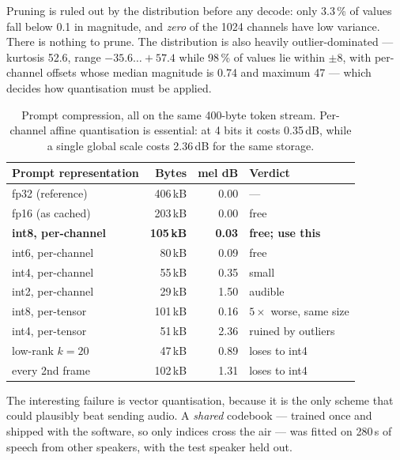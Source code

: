 Pruning is ruled out by the distribution before any decode: only
3.3\,\% of values fall below 0.1 in magnitude, and \emph{zero} of the
1024 channels have low variance.  There is nothing to prune.  The
distribution is also heavily outlier-dominated --- kurtosis 52.6, range
$-35.6\ldots+57.4$ while 98\,\% of values lie within $\pm 8$, with
per-channel offsets whose median magnitude is 0.74 and maximum 47 ---
which decides how quantisation must be applied.

\begin{table}[H]
    \centering
    \caption{Prompt compression, all on the same 400-byte token stream.
             Per-channel affine quantisation is essential: at 4 bits it
             costs 0.35\,dB, while a single global scale costs 2.36\,dB
             for the same storage.}
    \label{tab:voice_quant}
    \small
    \begin{tabular}{@{}lrrl@{}}
    \toprule
    \textbf{Prompt representation} & \textbf{Bytes} & \textbf{mel dB} &
    \textbf{Verdict} \\
    \midrule
    fp32 (reference)              & 406\,kB & 0.00 & --- \\
    fp16 (as cached)              & 203\,kB & 0.00 & free \\
    \textbf{int8, per-channel}    & \textbf{105\,kB} & \textbf{0.03} &
                                    \textbf{free; use this} \\
    int6, per-channel             &  80\,kB & 0.09 & free \\
    int4, per-channel             &  55\,kB & 0.35 & small \\
    int2, per-channel             &  29\,kB & 1.50 & audible \\
    \midrule
    int8, per-tensor              & 101\,kB & 0.16 & $5\times$ worse, same size \\
    int4, per-tensor              &  51\,kB & 2.36 & ruined by outliers \\
    low-rank $k=20$               &  47\,kB & 0.89 & loses to int4 \\
    every 2nd frame               & 102\,kB & 1.31 & loses to int4 \\
    \bottomrule
    \end{tabular}
\end{table}

The interesting failure is vector quantisation, because it is the only
scheme that could plausibly beat sending audio.  A \emph{shared}
codebook --- trained once and shipped with the software, so only indices
cross the air --- was fitted on 280\,s of speech from other speakers,
with the test speaker held out.

